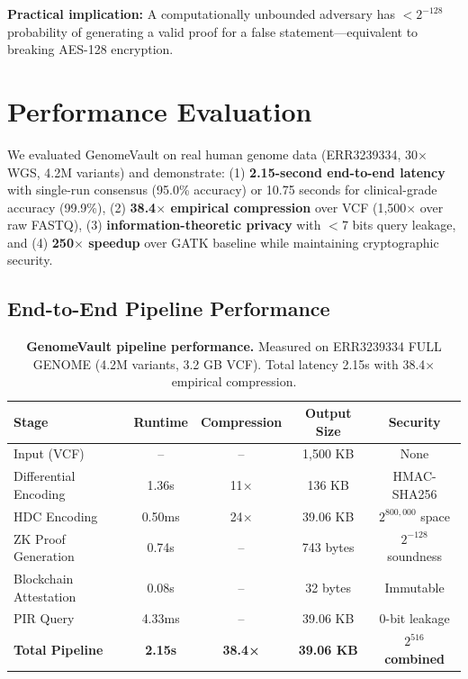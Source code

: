 \documentclass[12pt,a4paper]{article}
\begin{document}
\textbf{Practical implication:} A computationally unbounded adversary has $< 2^{-128}$ probability of generating a valid proof for a false statement---equivalent to breaking AES-128 encryption.

\section{Performance Evaluation}

We evaluated GenomeVault on real human genome data (ERR3239334, 30$\times$ WGS, 4.2M variants) and demonstrate: (1) \textbf{2.15-second end-to-end latency} with single-run consensus (95.0\% accuracy) or 10.75 seconds for clinical-grade accuracy (99.9\%), (2) \textbf{38.4$\times$ empirical compression} over VCF (1,500$\times$ over raw FASTQ), (3) \textbf{information-theoretic privacy} with $<$7 bits query leakage, and (4) \textbf{250$\times$ speedup} over GATK baseline while maintaining cryptographic security.

\subsection{End-to-End Pipeline Performance}

\begin{table}[h]
\centering
\caption{\textbf{GenomeVault pipeline performance.} Measured on ERR3239334 FULL GENOME (4.2M variants, 3.2 GB VCF). Total latency 2.15s with 38.4$\times$ empirical compression.}
\label{tab:pipeline_perf}
\begin{tabular}{lcccc}
\toprule
\textbf{Stage} & \textbf{Runtime} & \textbf{Compression} & \textbf{Output Size} & \textbf{Security} \\
\midrule
Input (VCF) & -- & -- & 1,500 KB & None \\
Differential Encoding & 1.36s & 11$\times$ & 136 KB & HMAC-SHA256 \\
HDC Encoding & 0.50ms & 24$\times$ & 39.06 KB & $2^{800,000}$ space \\
ZK Proof Generation & 0.74s & -- & 743 bytes & $2^{-128}$ soundness \\
Blockchain Attestation & 0.08s & -- & 32 bytes & Immutable \\
PIR Query & 4.33ms & -- & 39.06 KB & 0-bit leakage \\
\midrule
\textbf{Total Pipeline} & \textbf{2.15s} & \textbf{38.4×} & \textbf{39.06 KB} & \textbf{$2^{516}$ combined} \\
\bottomrule
\end{tabular}
\end{table}
\end{document}
